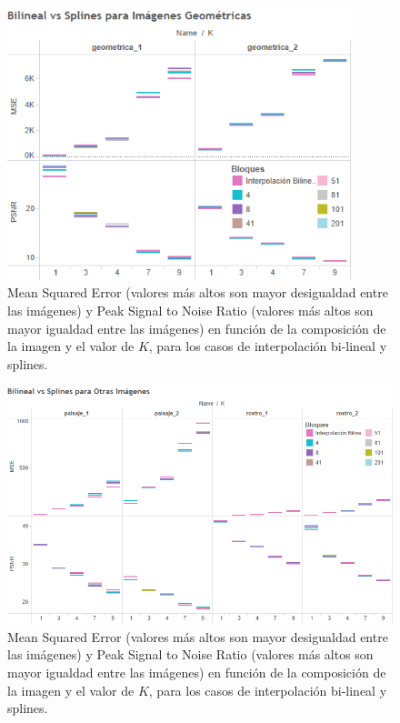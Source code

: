 \documentclass{article}
\begin{document}
\begin{figure}[H]
\centering
\includegraphics[width=10cm]{Bilineal vs Splines Geometricas}
\caption{Mean Squared Error (valores más altos son mayor desigualdad entre las imágenes) y Peak Signal to Noise Ratio (valores más altos son mayor igualdad entre las imágenes) en función de la composición de la imagen y el valor de $K$, para los casos de interpolación bi-lineal y splines.}
\label{fig:bilineal_vs_splines_geo}
\end{figure}

\begin{figure}[H]
\centering
\includegraphics[width=14cm]{Bilineal vs Splines para Otras Imagenes}
\caption{Mean Squared Error (valores más altos son mayor desigualdad entre las imágenes) y Peak Signal to Noise Ratio (valores más altos son mayor igualdad entre las imágenes) en función de la composición de la imagen y el valor de $K$, para los casos de interpolación bi-lineal y splines.}
\label{fig:bilineal_vs_splines}
\end{figure}
\end{document}
